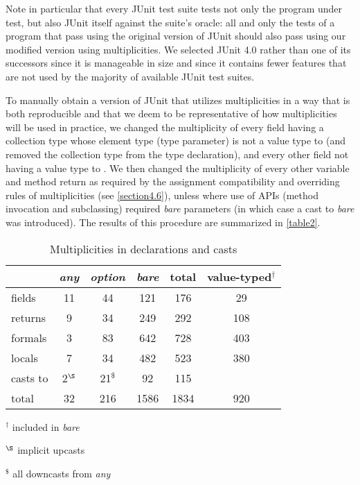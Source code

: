 {\noindent Note in particular that every JUnit test suite tests not only the
program under test, but also JUnit itself against the suite's oracle: all
and only the tests of a program that pass using the original version of
JUnit should also pass using our modified version using multiplicities. We
selected JUnit 4.0 rather than one of its successors since it is manageable
in size and since it contains fewer features that are not used by the
majority of available JUnit test suites.

To manually obtain a version of JUnit that utilizes multiplicities in a
way that is both reproducible and that we deem to be representative of how
multiplicities will be used in practice, we changed the multiplicity of
every field having a collection type whose element type (type parameter) is
not a value type to  (and removed the collection type from the
type declaration), and every other field not having a value type to
. We then changed the multiplicity of every other variable and
method return as required by the assignment compatibility and overriding
rules of multiplicities (see \autoref{section4.6}), unless where use of APIs (method
invocation and subclassing) required \emph{bare} parameters (in which
case a cast to \emph{bare} was introduced). The results of this
procedure are summarized in \autoref{table2}.

\begin{table}[h]
  \vspace{1em}
  \centering
  \begin{threeparttable}
    \begin{tabular}{l|ccc|c|c}
      \toprule
      & \emph{any} & \emph{option} & \emph{bare} & total & value-typed$^\dagger$ \\
      \hline
      fields & 11 & 44 & 121 & 176 & 29 \\
      returns & 9 & 34 & 249 & 292 & 108 \\
      formals & 3 & 83 & 642 & 728 & 403 \\
      locals & 7 & 34 & 482 & 523 & 380 \\
      casts to & 2$^\S$ & 21$^\$$ & 92 & 115 & \\
      \hline
      total & 32 & 216 & 1586 & 1834 & 920 \\
    \end{tabular}
    \begin{tablenotes}
      \small
      \item $^\dagger$ included in \emph{bare}
      \item $^\S$ implicit upcasts
      \item $^\$$ all downcasts from \emph{any}
    \end{tablenotes}
  \end{threeparttable}
  \caption{Multiplicities in declarations and casts}
  \label{table2}
\end{table}

}
